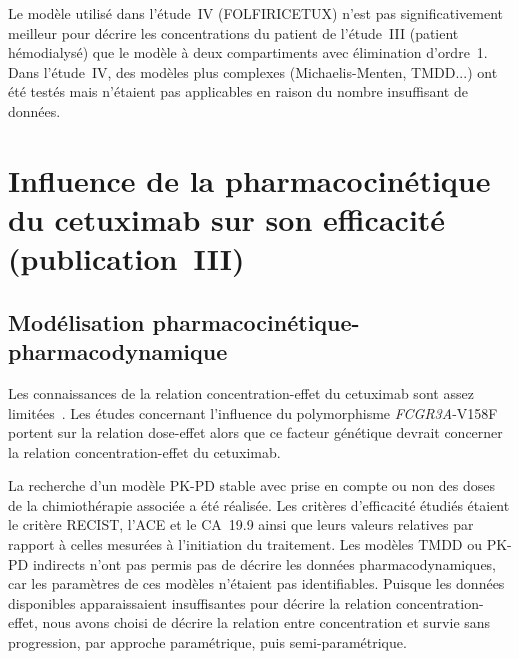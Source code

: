 Le modèle utilisé dans l'étude~IV (FOLFIRICETUX) n'est pas significativement meilleur pour décrire les concentrations du patient de l'étude~III (patient hémodialysé) que le modèle à deux compartiments avec élimination d'ordre~1. Dans l'étude~IV, des modèles plus complexes (Michaelis-Menten, TMDD...) ont été testés mais n'étaient pas applicables en raison du nombre insuffisant de données. 

\section{Influence de la pharmacocinétique du cetuximab sur son efficacité (publication~III)}
\subsection{Modélisation pharmacocinétique-pharmacodynamique}
Les connaissances de la relation concentration-effet du cetuximab sont assez limitées~\citep{REF122}. Les études concernant l'influence du polymorphisme \textit{FCGR3A}-V158F portent sur la relation dose-effet alors que ce facteur génétique devrait concerner la relation concentration-effet du cetuximab.

La recherche d'un modèle PK-PD stable avec prise en compte ou non des doses de la chimiothérapie associée a été réalisée. Les critères d'efficacité étudiés étaient le critère RECIST, l'ACE et le CA~19.9 ainsi que leurs valeurs relatives par rapport à celles mesurées à l'initiation du traitement. Les modèles TMDD ou PK-PD indirects n'ont pas permis pas de décrire les données pharmacodynamiques, car les paramètres de ces modèles n'étaient pas identifiables. Puisque les données disponibles apparaissaient insuffisantes pour décrire la relation concentration-effet, nous avons choisi de décrire la relation entre concentration et survie sans progression, par approche paramétrique, puis semi-paramétrique.

